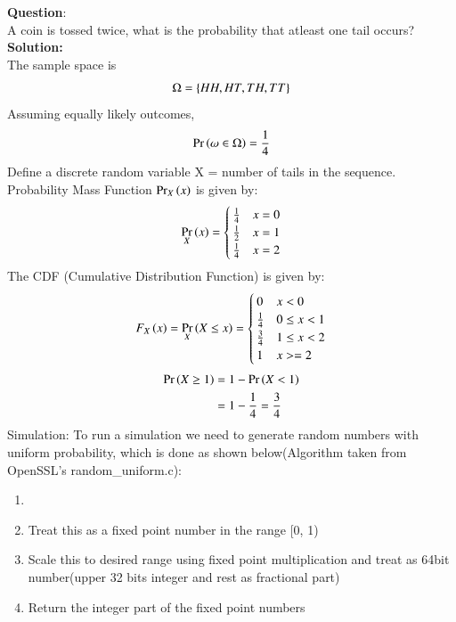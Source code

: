 \documentclass[journal]{IEEEtran}
\begin{document}
\textbf{Question}:\\
A coin is tossed twice, what is the probability that atleast one tail occurs?
\\
\textbf{Solution: }\\
The sample space is 
\begin{align}
  \Omega = \left\{HH, HT, TH, TT\right\}
\end{align}
Assuming equally likely outcomes, 
\begin{align}
  \Pr\left(\omega \in \Omega\right) = \frac{1}{4}
\end{align}
Define a discrete random variable X = number of tails in the sequence.
\newline
Probability Mass Function $\Pr_{X}\left(x\right)$ is given by:
\begin{align}
  \Pr_{X}\left(x\right) = \begin{cases}
\frac{1}{4} & x = 0\\
    \frac{1}{2} & x = 1\\
    \frac{1}{4} & x = 2\\
\end{cases}
\end{align}
The CDF (Cumulative Distribution Function) is given by:
\begin{align}
  F_{X}\left(x\right) = \Pr_X\left(X \le x\right) = \begin{cases}
    0 & x < 0\\
    \frac{1}{4} & 0 \le x < 1\\
    \frac{3}{4} & 1 \le x < 2\\
    1 & x >=2
  \end{cases}
\end{align}
\begin{align}
  \Pr\left(X \ge 1\right) &= 1 - \Pr\left(X < 1\right)\\
  &= 1 - \frac{1}{4} = \frac{3}{4}
\end{align}
Simulation:
\newline
To run a simulation we need to generate random numbers with uniform probability, which is done
as shown below(Algorithm taken from OpenSSL's random\_uniform.c):
\begin{enumerate}
  \item {}
  \item Treat this as a fixed point number in the range [0, 1)
  \item Scale this to desired range using fixed point multiplication and treat as 64bit number(upper 32 bits integer and rest as fractional part)
  \item Return the integer part of the fixed point numbers
\end{enumerate}
\end{document}
